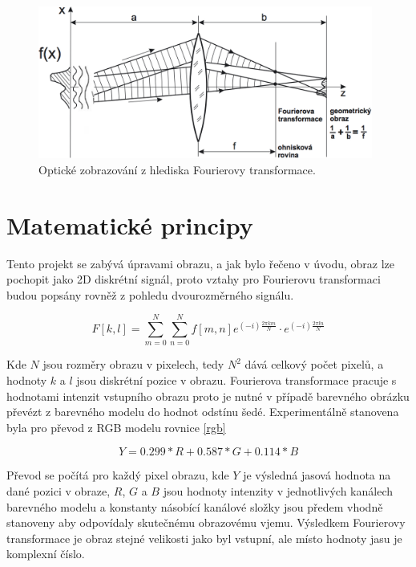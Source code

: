 \documentclass[11pt,a4paper]{article}
\begin{document}
\begin{figure}[H]
\centering
\includegraphics[width=11cm]{images/ft-cocka.png}
\caption{Optické zobrazování z hlediska Fourierovy transformace.}
\label{lcpstack}
\end{figure}




\section{Matematické principy}
Tento projekt se zabývá úpravami obrazu, a jak bylo řečeno v úvodu, obraz lze pochopit jako 2D diskrétní 
signál, proto vztahy pro Fourierovu transformaci budou popsány rovněž z pohledu dvourozměrného signálu.

\begin{equation}
F[k,l] = \sum_{m=0}^{N}{\sum_{n=0}^{N}{f[m,n]e^{(-i)\frac{2\pi km}{N}}\cdot e^{(-i)\frac{2\pi ln}{N}}}}
\label{dft}
\end{equation}

Kde $N$ jsou rozměry obrazu v pixelech, tedy $N^2$ dává celkový počet pixelů, a hodnoty $k$ a $l$ 
jsou diskrétní pozice v obrazu. Fourierova transformace pracuje s hodnotami intenzit vstupního obrazu
proto je nutné v případě barevného obrázku převézt z barevného modelu do hodnot odstínu šedé. Experimentálně
stanovena byla pro převod z RGB modelu rovnice \ref{rgb}

\begin{equation}
Y = 0.299*R + 0.587*G + 0.114*B
\label{rgb}
\end{equation}

Převod se počítá pro každý pixel obrazu, kde $Y$ je výsledná jasová hodnota na dané pozici v obraze,
$R$, $G$ a $B$ jsou hodnoty intenzity v jednotlivých kanálech barevného modelu a konstanty násobící
kanálové složky jsou předem vhodně stanoveny aby odpovídaly skutečnému obrazovému vjemu.
Výsledkem Fourierovy transformace je obraz stejné velikosti jako byl vstupní, ale místo hodnoty jasu
je komplexní číslo.
\end{document}

